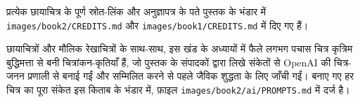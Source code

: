 प्रत्येक छायाचित्र के पूर्ण स्रोत-लिंक और अनुज्ञापत्र के पते पुस्तक के
भंडार में \texttt{images/\allowbreak book2/\allowbreak CREDITS.md} और
\texttt{images/\allowbreak book1/\allowbreak CREDITS.md} में दिए गए हैं।

\bigskip
छायाचित्रों और मौलिक रेखाचित्रों के साथ-साथ, इस खंड के अध्यायों में फैले
लगभग पचास चित्र कृत्रिम बुद्धिमत्ता से बनी चित्रांकन-कृतियाँ हैं, जो
पुस्तक के संपादकों द्वारा लिखे संकेतों से OpenAI की चित्र-जनन प्रणाली से
बनाई गईं और सम्मिलित करने से पहले जैविक शुद्धता के लिए जाँची गईं।
बनाए गए हर चित्र का पूरा संकेत इस किताब के भंडार में, फ़ाइल
\texttt{images/\allowbreak book2/\allowbreak ai/\allowbreak PROMPTS.md} में दर्ज है।
\par\endgroup
\clearpage
